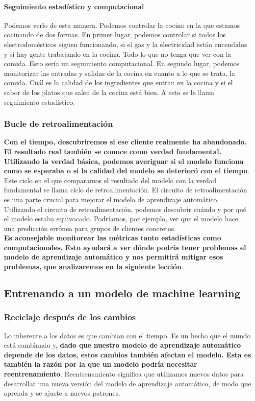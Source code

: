 \documentclass[10pt]{book}
\begin{document}
\paragraph{Seguimiento estadístico y computacional}
Podemos verlo de esta manera. Podemos controlar la cocina en la que estamos cocinando de dos formas. En primer lugar, podemos controlar si todos los electrodomésticos siguen funcionando, si el gas y la electricidad están encendidos y si hay gente trabajando en la cocina. Todo lo que no tenga que ver con la comida. Esto sería un seguimiento computacional. En segundo lugar, podemos monitorizar las entradas y salidas de la cocina en cuanto a lo que se trata, la comida. Cuál es la calidad de los ingredientes que entran en la cocina y si el sabor de los platos que salen de la cocina está bien. A esto se le llama seguimiento estadístico.

\subsubsection{Bucle de retroalimentación}
\textbf{Con el tiempo, descubriremos si ese cliente realmente ha abandonado. El resultado real también se conoce como verdad fundamental. Utilizando la verdad básica, podemos averiguar si el modelo funciona como se esperaba o si la calidad del modelo se deterioró con el tiempo}. Este ciclo en el que comparamos el resultado del modelo con la verdad fundamental se llama ciclo de retroalimentación. El circuito de retroalimentación es una parte crucial para mejorar el modelo de aprendizaje automático. Utilizando el circuito de retroalimentación, podemos descubrir cuándo y por qué el modelo estaba equivocado. Podríamos, por ejemplo, ver que el modelo hace una predicción errónea para grupos de clientes concretos.\\

\textbf{Es aconsejable monitorear las métricas tanto estadísticas como computacionales. Esto ayudará a ver dónde podría tener problemas el modelo de aprendizaje automático y nos permitirá mitigar esos problemas, que analizaremos en la siguiente lección}.


\subsection{Entrenando a un modelo de machine learning}

\subsubsection{Reciclaje después de los cambios}
Lo inherente a los datos es que cambian con el tiempo. Es un hecho que el mundo está cambiando y, \textbf{dado que nuestro modelo de aprendizaje automático depende de los datos, estos cambios también afectan el modelo. Esta es también la razón por la que un modelo podría necesitar reentrenamiento}. Reentrenamiento significa que utilizamos nuevos datos para desarrollar una nueva versión del modelo de aprendizaje automático, de modo que aprenda y se ajuste a nuevos patrones.
\end{document}

